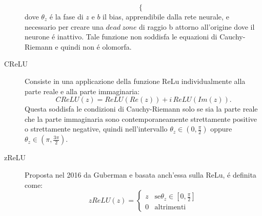 \documentclass[a4paper,10pt]{article}
\begin{document}
\begin{description}
\begin{equation}
\begin{cases}
                                                                \end{cases}
 \end{equation}
 dove $\theta_z$ \'e la fase di $z$ e $b$ il bias, apprendibile dalla rete neurale, e necessario per creare una $dead \ zone$ di raggio b attorno all'origine dove il neurone \'e inattivo. Tale funzione non soddisfa le equazioni di Cauchy-Riemann e quindi non \'e olomorfa.
 
 \item[CReLU]
 Consiste in una applicazione della funzione ReLu individualmente alla parte reale e alla parte immaginaria:
 \begin{equation}
  CReLU\left( z\right) = ReLU\left( Re\left( z\right)\right) + i \, ReLU\left( Im\left( z\right)\right).
 \end{equation}
 Questa soddisfa le condizioni di Cauchy-Riemann solo se sia la parte reale che la parte immaginaria sono contemporaneamente strettamente positive o strettamente negative, quindi nell'intervallo $\theta_z \in \left( 0, \frac{\pi}{2}\right)$ oppure $\theta_z \in \left( \pi, \frac{ 3 \pi}{2}\right)$.
 
 \item[zReLU]
 Proposta nel 2016 da Guberman e basata anch'essa sulla ReLu, \'e definita come:
 \begin{equation}
   zReLU\left( z\right) = \begin{cases}
                                                                                               z & \mbox{se} \theta_z \in \left[ 0, \frac{ \pi}{2}\right] \\
                                                                                0 & \mbox{altrimenti}
                                                             
                                                     \end{cases}
 \end{equation}




\end{description}
\end{document}
